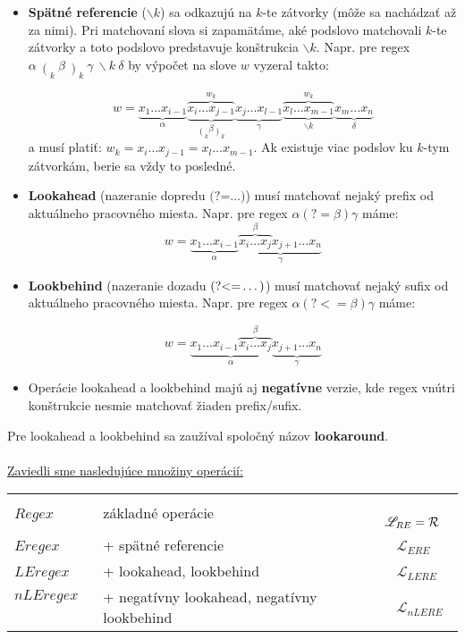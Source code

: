 \documentclass[myposter,portrait,plainboxedsections]{sciposter}
\def\R{{\cal R}} %
\def\re{Regex}
\def\e{Eregex}
\def\le{LEregex}
\def\nle{nLEregex}
\def\rel{{\mathscr{L}_{RE}}}
\def\el{\mathscr{L}_{ERE}}
\def\lel{\mathscr{L}_{LERE}}
\def\nlel{\mathscr{L}_{nLERE}}
\def\lookahead{\text{(?=}}
\def\lookbehind{\text{(?\textless =}}
\begin{document}
\begin{multicols*}{3}
\begin{itemize}

\item \textbf{Spätné referencie} ($\backslash k$) sa odkazujú na $k$-te zátvorky (môže sa nachádzať až za nimi). Pri matchovaní slova si zapamätáme, aké podslovo matchovali $k$-te zátvorky a toto podslovo predstavuje konštrukcia $\backslash k$. Napr. pre regex
 $\displaystyle \alpha~ \mathop(_k ~\beta ~\mathop)_k ~\gamma ~\backslash k ~\delta$ by výpočet na slove $w$ vyzeral takto:

$$w = \underbrace{x_1\dots x_{i-1}}_\alpha 
 \overbrace{\underbrace{x_i\dots x_{j-1}}_{ \displaystyle{\mathop(_k\beta \mathop)_k}}}^{w_k} 
 \underbrace{x_j\dots x_{l-1}}_\gamma 
 \overbrace{\underbrace{x_l\dots x_{m-1}}_{\backslash k}}^{w_k}
 \underbrace{x_{m}\dots x_{n}}_\delta$$
a musí platiť: $w_k= x_i\dots x_{j-1} = x_l\dots x_{m-1} $. Ak existuje viac podslov ku $k$-tym zátvorkám, berie sa vždy to posledné.

\item \textbf{Lookahead} (nazeranie dopredu $\lookahead\dots)$) musí matchovať nejaký prefix od aktuálneho pracovného miesta. Napr. pre regex $\alpha(?=\beta)\gamma$ máme:
 $$w = \underbrace{x_1\dots x_{i-1}}_\alpha \underbrace{\overbrace{x_i \dots x_j}^\beta x_{j+1} \dots x_n }_\gamma$$ 

\item \textbf{Lookbehind} (nazeranie dozadu $\lookbehind\dots)$) musí matchovať nejaký sufix od aktuálneho pracovného miesta. Napr. pre regex $\alpha(?<=\beta)\gamma$ máme:

$$w = \underbrace{x_1\dots x_{i-1} \overbrace{x_i \dots x_j}^\beta}_\alpha \underbrace{x_{j+1} \dots x_n }_\gamma$$

\item Operácie lookahead a lookbehind majú aj \textbf{negatívne} verzie, kde regex vnútri konštrukcie nesmie matchovať žiaden prefix/sufix.

\end{itemize}
Pre lookahead a lookbehind sa zaužíval spoločný názov \textbf{lookaround}.
\\ \\
\underline{Zaviedli sme nasledujúce množiny operácií:}

\begin{tabular}{lll}
$\re$ ~& základné operácie &~ $\rel = \R$ \\
$\e$ ~& + spätné referencie &~ $\el$ \\
$\le$ ~& + lookahead, lookbehind &~ $\lel$ \\
$\nle$ ~& + negatívny lookahead, negatívny lookbehind &~ $\nlel$
\end{tabular}


\end{multicols*}
\end{document}
